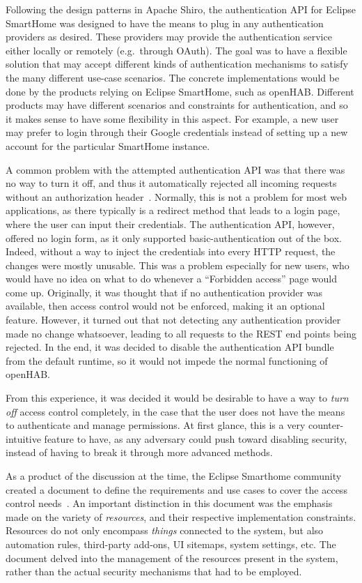 \documentclass[12pt]{article}
\begin{document}
Following the design patterns in Apache Shiro, the authentication API for Eclipse SmartHome was designed to have the means to plug in any authentication providers as desired. These providers may provide the authentication service either locally or remotely (e.g.\ through OAuth). The goal was to have a flexible solution that may accept different kinds of authentication mechanisms to satisfy the many different use-case scenarios. The concrete implementations would be done by the products relying on Eclipse SmartHome, such as openHAB. Different products may have different scenarios and constraints for authentication, and so it makes sense to have some flexibility in this aspect. For example, a new user may prefer to login through their Google credentials instead of setting up a new account for the particular SmartHome instance. 

A common problem with the attempted authentication API was that there was no way to turn it off, and thus it automatically rejected all incoming requests without an authorization header~\cite{esh_05}. Normally, this is not a problem for most web applications, as there typically is a redirect method that leads to a login page, where the user can input their credentials. The authentication API, however, offered no login form, as it only supported basic-authentication out of the box. Indeed, without a way to inject the credentials into every HTTP request, the changes were mostly unusable. This was a problem especially for new users, who would have no idea on what to do whenever a ``Forbidden access'' page would come up. Originally, it was thought that if no authentication provider was available, then access control would not be enforced, making it an optional feature. However, it turned out that not detecting any authentication provider made no change whatsoever, leading to all requests to the REST end points being rejected. In the end, it was decided to disable the authentication API bundle from the default runtime, so it would not impede the normal functioning of openHAB.

From this experience, it was decided it would be desirable to have a way to \emph{turn off} access control completely, in the case that the user does not have the means to authenticate and manage permissions. At first glance, this is a very counter-intuitive feature to have, as any adversary could push toward disabling security, instead of having to break it through more advanced methods. 

As a product of the discussion at the time, the Eclipse Smarthome community created a document to define the requirements and use cases to cover the access control needs~\cite{esh_06}. An important distinction in this document was the emphasis made on the variety of \emph{resources}, and their respective implementation constraints. Resources do not only encompass \emph{things} connected to the system, but also automation rules, third-party add-ons, UI sitemaps, system settings, etc. The document delved into the management of the resources present in the system, rather than the actual security mechanisms that had to be employed. 
\end{document}
